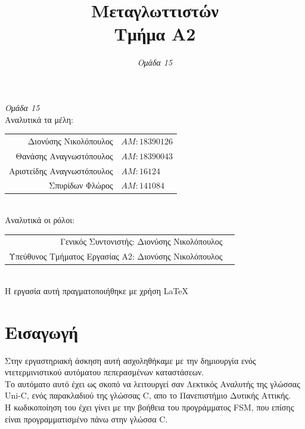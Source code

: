 \documentclass[14pt]{extarticle}
\title{\bfΕργασία Μεταγλωττιστών \\ Τμήμα Α2}
\author{
  \emph{Ομάδα 15}
}
\begin{document}
\begin{titlepage}
  \maketitle
  \begin{center}
    \large \emph{Ομάδα 15}
    \\
    Αναλυτικά τα μέλη:
\vspace{5mm}
  \begin{tabular}{r l}
    \\Διονύσης Νικολόπουλος & $AM: 18390126$
    \\Θανάσης Αναγνωστόπουλος & $AM: 18390043$
    \\Αριστείδης Αναγνωστόπουλος & $AM: 16124$
    \\Σπυρίδων Φλώρος & $AM: 141084$
  \end{tabular}
\vspace{5mm}
    \\
    Αναλυτικά οι ρόλοι:
    \\
\vspace{5mm}
  \begin{tabular}{r l}
    \small Γενικός Συντονιστής:   Διονύσης Νικολόπουλος
    \\
    \small Υπεύθυνος Τμήματος Εργασίας Α2: Διονύσης Νικολόπουλος
  \end{tabular}
  \\
\vspace*{\fill}
    \footnotesize{Η εργασία αυτή πραγματοποιήθηκε με χρήση \LaTeX}
  \end{center}
\end{titlepage}

\tableofcontents
\clearpage

\section{Εισαγωγή}
Στην εργαστηριακή άσκηση αυτή ασχοληθήκαμε με την δημιουργία ενός ντετερμινιστικού αυτόματου πεπερασμένων καταστάσεων.
\\
Το αυτόματο αυτό έχει ως σκοπό να λειτουργεί σαν Λεκτικός Αναλυτής της γλώσσας \textlatin{Uni-C}, ενός παρακλαδιού της γλώσσας \textlatin{C}, απο το Πανεπιστήμιο Δυτικής Αττικής.  
\\
Η κωδικοποίηση του έχει γίνει με την βοήθεια του προγράμματος \textlatin{FSM}, που επίσης είναι προγραμματισμένο πάνω στην γλώσσα \textlatin{C}. 
\clearpage
\end{document}
